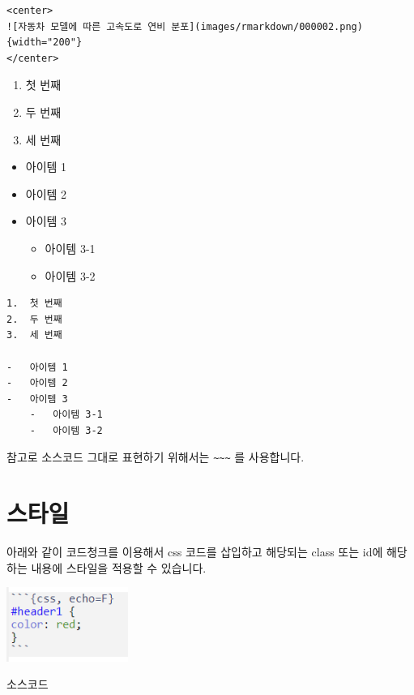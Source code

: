 \documentclass[
]{book}
\providecommand{\tightlist}{%
  \setlength{\itemsep}{0pt}\setlength{\parskip}{0pt}}
\begin{document}
\begin{verbatim}
<center>
![자동차 모델에 따른 고속도로 연비 분포](images/rmarkdown/000002.png){width="200"}
</center>
\end{verbatim}

\begin{enumerate}
\def\labelenumi{\arabic{enumi}.}
\tightlist
\item
  첫 번째
\item
  두 번째
\item
  세 번째
\end{enumerate}

\begin{itemize}
\tightlist
\item
  아이템 1
\item
  아이템 2
\item
  아이템 3

  \begin{itemize}
  \tightlist
  \item
    아이템 3-1
  \item
    아이템 3-2
  \end{itemize}
\end{itemize}

\begin{verbatim}
1.  첫 번째
2.  두 번째
3.  세 번째

-   아이템 1
-   아이템 2
-   아이템 3
    -   아이템 3-1
    -   아이템 3-2
\end{verbatim}

참고로 소스코드 그대로 표현하기 위해서는 \texttt{\textasciitilde{}\textasciitilde{}\textasciitilde{}} 를 사용합니다.

\hypertarget{uxc2a4uxd0c0uxc77c}{%
\section{스타일}\label{uxc2a4uxd0c0uxc77c}}

아래와 같이 코드청크를 이용해서 css 코드를 삽입하고 해당되는 class 또는 id에 해당하는 내용에 스타일을 적용할 수 있습니다.

\includegraphics[width=1.5625in,height=\textheight]{images/02/style.png}

\leavevmode{}%
소스코드
\end{document}
